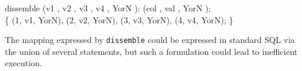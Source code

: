 \begin{codedisplay}
 dissemble (v1 , v2 , v3 ,
v4 , YorN ): (col , val , YorN ); \\[0.2cm]
 \{\>    (1, v1, YorN),
 (2, v2, YorN), \kw{}(3, v3, YorN), (4, v4, YorN);
\}
\end{codedisplay}
 The mapping expressed by {\tt dissemble} could be expressed in standard
 SQL via the union of several statements, but such a formulation could
 lead to inefficient execution.
